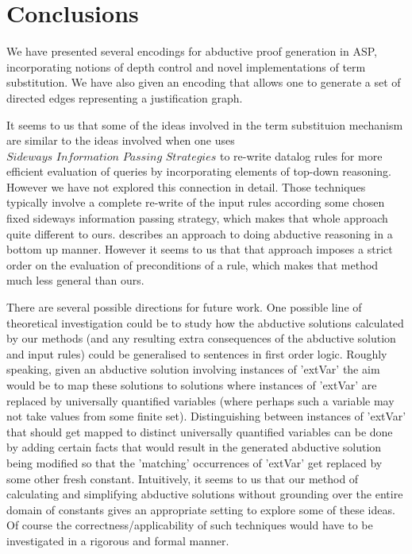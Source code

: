 \section{ Conclusions}\label{sec:conclusion}
We have presented several encodings for abductive proof generation in ASP,
incorporating notions of depth control and  novel implementations of term
substitution. We have also given an encoding that allows one to generate a set
of directed edges representing a justification graph.

It seems to us that some of the ideas involved in the term substituion
mechanism are similar to the ideas involved when one uses $\textit{Sideways
  Information Passing Strategies}$ \cite{beeri91} to re-write datalog rules
for more efficient evaluation of queries by incorporating elements of top-down
reasoning. However we have not explored this connection in detail. Those techniques 
typically involve a complete re-write of the input
rules according some chosen fixed sideways information passing strategy, which
makes that whole approach quite different to ours. \cite{DBLP:journals/jar/Stickel94} describes an approach 
to doing abductive reasoning in a bottom up manner. However it seems to us that
that approach 
imposes a strict order on the evaluation of preconditions of a rule, which makes 
that method much less general than ours. 

There are several possible directions for future work. One possible line of theoretical investigation 
could be to study how the abductive solutions calculated by our methods (and any resulting extra
consequences of the abductive solution and input rules) could be generalised to 
sentences in first order logic. Roughly speaking, given an abductive solution involving
instances of 'extVar' the aim would be to map these solutions to solutions where instances
of 'extVar' are replaced by universally quantified variables (where perhaps such a variable may
not take values from some finite set).  Distinguishing between instances of 'extVar' that should 
get mapped to distinct universally quantified variables can be done by adding certain facts 
that would result in the generated abductive solution being modified so that the 'matching' 
occurrences of 'extVar' get replaced by some other fresh constant. Intuitively, it seems to 
us that our method of calculating and simplifying abductive solutions without grounding over
the entire domain of constants gives an appropriate 
setting to explore some of these ideas. Of course the correctness/applicability of such techniques 
would have to be investigated in a rigorous and formal manner.


